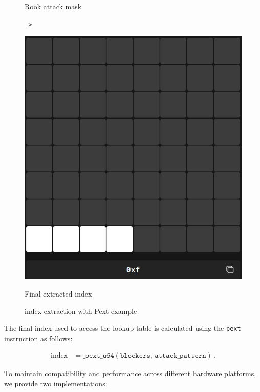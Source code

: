 \begin{figure}[H]
\begin{minipage}[c]{0.3\textwidth}
        \caption{Rook attack mask}
    \end{minipage}
    \hfill
    \begin{minipage}[c]{0.05\textwidth}
        \centering
        \Huge\texttt{->}
    \end{minipage}
    \hfill
    \begin{minipage}[c]{0.3\textwidth}
        \centering
        \includegraphics[width=\textwidth]{Imagenes/pext_final_index.png}
        \caption{Final extracted index}
    \end{minipage}
    \caption{index extraction with Pext example}
    \label{fig:pext_bitboards}
\end{figure}

\noindent The final index used to access the lookup table is calculated using the \texttt{pext} instruction as follows:

\begin{align*}
    \text{index}
    &= \texttt{\_pext\_u64}(\texttt{blockers},\,\texttt{attack\_pattern})\,.
\end{align*}

\noindent To maintain compatibility and performance across different hardware platforms, we provide two implementations:

